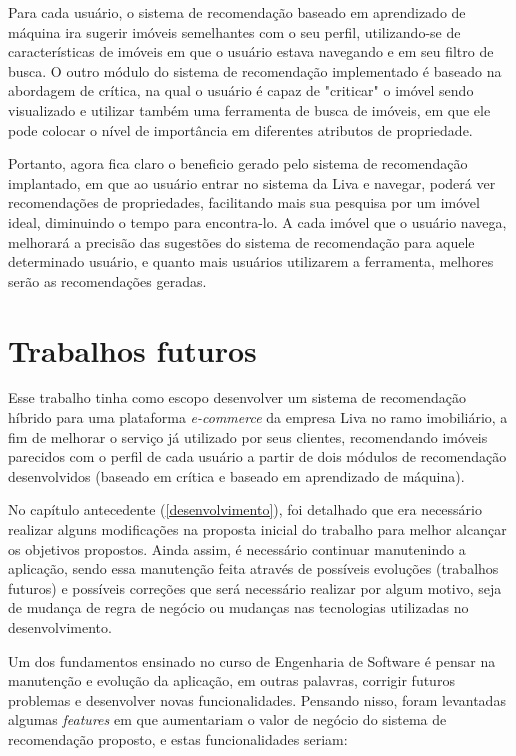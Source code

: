 Para cada usuário, o sistema de recomendação baseado em aprendizado de máquina ira sugerir imóveis semelhantes com o seu perfil, utilizando-se de características de imóveis em que o usuário estava navegando e em seu filtro de busca. O outro módulo do sistema de recomendação implementado é baseado na abordagem de crítica, na qual o usuário é capaz de "criticar" o imóvel sendo visualizado e utilizar também uma ferramenta de busca de imóveis, em que ele pode colocar o nível de importância em diferentes atributos de propriedade.

Portanto, agora fica claro o beneficio gerado pelo sistema de recomendação implantado, em que ao usuário entrar no sistema da Liva e navegar, poderá ver recomendações de propriedades, facilitando mais sua pesquisa por um imóvel ideal, diminuindo o tempo para encontra-lo. A cada imóvel que o usuário navega, melhorará a precisão das sugestões do sistema de recomendação para aquele determinado usuário, e quanto mais usuários utilizarem a ferramenta, melhores serão as recomendações geradas.

\section{Trabalhos futuros}

Esse trabalho tinha como escopo desenvolver um sistema de recomendação híbrido para uma plataforma \textit{e-commerce} da empresa Liva no ramo imobiliário, a fim de melhorar o serviço já utilizado por seus clientes, recomendando imóveis parecidos com o perfil de cada usuário a partir de dois módulos de recomendação desenvolvidos (baseado em crítica e baseado em aprendizado de máquina).

No capítulo antecedente (\ref{desenvolvimento}), foi detalhado que era necessário realizar alguns modificações na proposta inicial do trabalho para melhor alcançar os objetivos propostos. Ainda assim, é necessário continuar manutenindo a aplicação, sendo essa manutenção feita através de possíveis evoluções (trabalhos futuros) e possíveis correções que será necessário realizar por algum motivo, seja de mudança de regra de negócio ou mudanças nas tecnologias utilizadas no desenvolvimento.

Um dos fundamentos ensinado no curso de Engenharia de Software é pensar na manutenção e evolução da aplicação, em outras palavras, corrigir futuros problemas e desenvolver novas funcionalidades. Pensando nisso, foram levantadas algumas \textit{features} em que aumentariam o valor de negócio do sistema de recomendação proposto, e estas funcionalidades seriam:

